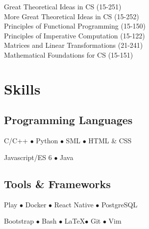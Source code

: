 \documentclass[]{openfont}
\begin{document}
\begin{minipage}[t]{0.40\textwidth}
Great Theoretical Ideas in CS (15-251) \\
More Great Theoretical Ideas in CS (15-252) \\
Principles of Functional Programming (15-150) \\

Principles of Imperative Computation (15-122) \\
Matrices and Linear Transformations (21-241) \\
Mathematical Foundations for CS (15-151)
\sectionsep


\section{Skills}
\subsection{Programming Languages}
\vspace{\topsep}
C/C++ \(\bullet\)
Python \(\bullet\)
SML \(\bullet\)
HTML \& CSS

Javascript/ES 6 \(\bullet\)
Java

\sectionsep

\subsection{Tools \& Frameworks}
\vspace{\topsep}
Play \(\bullet\)
Docker \(\bullet\)
React Native \(\bullet\)
PostgreSQL

Bootstrap \(\bullet\)
Bash \(\bullet\)
\LaTeX \(\bullet\)
Git \(\bullet\)
Vim
\sectionsep

%
%

\end{minipage} 
\hfill
\end{document}
